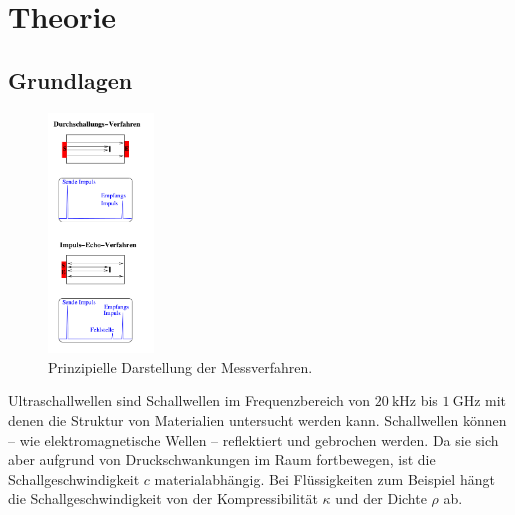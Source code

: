 \section{Theorie}
\label{sec:Theorie}

\subsection{Grundlagen}
\begin{figure}
	\centering
	\includegraphics[width=0.25\textwidth]{Bilder/Messverfahren.png}
	\caption{Prinzipielle Darstellung der Messverfahren. \cite{Anleitung}}
	\label{fig:echo}
\end{figure}
Ultraschallwellen sind Schallwellen im Frequenzbereich von $\SI{20}{\kilo\hertz}$ bis
$\SI{1}{\giga\hertz}$ mit denen die Struktur von Materialien untersucht werden kann.
Schallwellen können -- wie elektromagnetische Wellen -- reflektiert und gebrochen werden.
Da sie sich aber aufgrund von Druckschwankungen im Raum fortbewegen, ist die
Schallgeschwindigkeit $c$ materialabhängig. Bei Flüssigkeiten zum Beispiel hängt die
Schallgeschwindigkeit von der Kompressibilität $\kappa$ und der Dichte $\rho$ ab.
